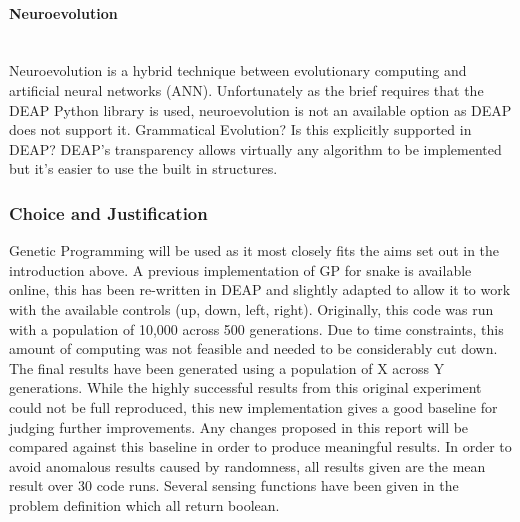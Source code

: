 \documentclass{article}
\newcommand{\myparagraph}[1]{\paragraph{#1}\mbox{}\\}
\begin{document}
\myparagraph{Neuroevolution}
Neuroevolution is a hybrid technique between evolutionary computing and artificial neural networks (ANN).
Unfortunately as the brief requires that the DEAP Python library is used, neuroevolution is not an available option as DEAP does not support it.
Grammatical Evolution? Is this explicitly supported in DEAP?\cite{deap}
DEAP's transparency allows virtually any algorithm to be implemented but it's easier to use the built in structures.



\subsubsection{Choice and Justification}
Genetic Programming will be used as it most closely fits the aims set out in the introduction above. A previous implementation of GP for snake is available online\cite{snake_blog}, this has been re-written in DEAP and slightly adapted to allow it to work with the available controls (up, down, left, right). Originally, this code was run with a population of 10,000 across 500 generations. Due to time constraints, this amount of computing was not feasible and needed to be considerably cut down. The final results have been generated using a population of X across Y generations. While the highly successful results from this original experiment could not be full reproduced, this new implementation gives a good baseline for judging further improvements. Any changes proposed in this report will be compared against this baseline in order to produce meaningful results. In order to avoid anomalous results caused by randomness, all results given are the mean result over 30 code runs.%
Several sensing functions have been given in the problem definition which all return boolean.
\end{document}
